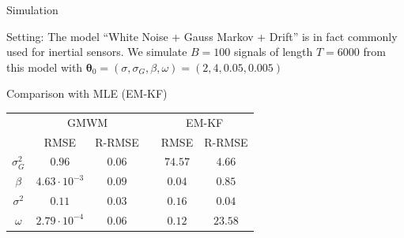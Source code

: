 \documentclass[envcountsect,usenames,dvipsnames]{beamer}
\theoremstyle{mystyle}
\begin{document}
\begin{frame}{Simulation}
	\begin{block}{Setting:}
		The model ``White Noise + Gauss Markov + Drift'' is in fact commonly used for inertial sensors. We simulate $B = 100$ signals of length $T = 6000$ from this model with
			$\bm{\theta}_0 = \left( \sigma , \sigma_{G}, \beta, \omega \right) = \left( 2 , 4, 0.05 ,0.005 \right)$
		\end{block}
	
	\begin{exampleblock}{Comparison with MLE (EM-KF)}
		\small
		\vspace{0.1cm} \phantom{a}
		
		\begin{table}
			\centering
			\begin{tabular}{c c c c c c}
			\toprule
				& \multicolumn{2}{c}{GMWM} && \multicolumn{2}{c}{EM-KF} \\
				\cline{2-3} 
				\cline{5-6}
				& RMSE & R-RMSE & &RMSE & R-RMSE \\
				\midrule
				 	$\sigma_{G}^2$     & $0.96$   & $0.06$ & & $74.57$                       & $4.66$ \\
					          $\beta$          & $4.63 \cdot 10^{-3}$ & $0.09$ & & $0.04$                         & $0.85$ \\ 
					          $\sigma^2$  & $0.11$               & $0.03$ & & $0.16$                         & $0.04$ \\
					          $\omega$         & $2.79 \cdot 10^{-4}$ & $0.06$ & & $0.12$                         & $23.58$\\ 
			\bottomrule
			\end{tabular}
		\end{table}
		
		\vspace{-0.15cm}
	\end{exampleblock}
\end{frame}
\end{document}
